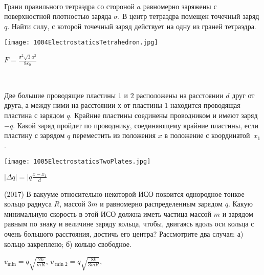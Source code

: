 \begin{ex}
\hspace{0pt} \\
\begin{minipage}{.65\textwidth}
Грани правильного тетраэдра со стороной $a$ равномерно заряжены с поверхностной плотностью заряда $\sigma$. 
В центр тетраэдра помещен точечный заряд $q$. Найти силу, с которой точечный заряд действует на одну из граней тетраэдра.
\end{minipage}
\begin{minipage}{.35\textwidth}
\centering
\texttt{[image: 1004ElectrostaticsTetrahedron.jpg]}
\end{minipage}
\begin{ans}
$F = \frac{\sigma^2 \sqrt{3}a^2}{8\varepsilon_0}$
\end{ans}
\end{ex}

\begin{ex}
\hspace{0pt} \\
\begin{minipage}{.65\textwidth}
Две большие проводящие пластины $1$ и $2$ расположены на расстоянии $d$ друг от друга, 
а между ними на расстоянии $х$ от пластины $1$ находится проводящая пластина с зарядом $q$. 
Крайние пластины соединены проводником и имеют заряд $-q$. 
Какой заряд пройдет по проводнику, соединяющему крайние пластины, если пластину с зарядом $q$ переместить из положения $x$ в положение с координатой~$x_1$.
\end{minipage}
\begin{minipage}{.35\textwidth}
\centering
\texttt{[image: 1005ElectrostaticsTwoPlates.jpg]}
\end{minipage}
\begin{ans}
$\mid\Delta q \mid = \mid q \frac{x-x_1}{d}$
\end{ans}
\end{ex}

\begin{ex}
(2017) В вакууме относительно некоторой ИСО покоится однородное тонкое кольцо радиуса $R$, массой $3m$ и равномерно распределенным зарядом $q$. Какую минимальную скорость в этой ИСО должна иметь частица массой $m$ и зарядом равным по знаку и величине заряду кольца, чтобы, двигаясь вдоль оси кольца с очень большого расстояния, достичь его центра? Рассмотрите два случая: а) кольцо закреплено; б) кольцо свободное.
\begin{ans}
$v_{\min} = q\sqrt{\frac{2k}{mR}}$, $v_{\min 2} = q\sqrt{\frac{8k}{3mR}}$, 
\end{ans}
\end{ex}

